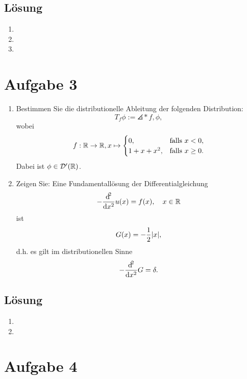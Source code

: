 \documentclass{exercise}
\begin{document}
    \subsection*{Lösung}
    \begin{enumerate}
        \item
        \item
        \item
    \end{enumerate}


    \section*{Aufgabe 3}
    
    \begin{problem}
        \begin{enumerate}
            \item Bestimmen Sie die distributionelle Ableitung der folgenden Distribution:
            \[
                T_f \phi := \angles*{f, \phi},
            \]
            wobei
            \[
                f: \mathbb{R} \to \mathbb{R}, x \mapsto \begin{cases}
                    0, & \text{falls }x < 0,\\
                    1 + x + x^2, & \text{falls }x \ge 0.
                \end{cases}
            \]
            Dabei ist \(\phi \in \mathcal{D}'\parentheses*{\R}\).
            \item Zeigen Sie: Eine Fundamentallösung der Differentialgleichung
            \[
                -\frac{\d^2}{\d x^2}u\parentheses*{x} = f\parentheses*{x}, \quad x \in \R
            \]
            ist
            \[
                G\parentheses*{x} = -\frac{1}{2}\absolute*{x},
            \]
            d.h. es gilt im distributionellen Sinne
            \[
                -\frac{\mathop{\mathrm{d}\!}^2}{\mathop{\mathrm{d}\!} x^2}G = \delta.
            \]
        \end{enumerate}
    \end{problem}
    
    \subsection*{Lösung}
    \begin{enumerate}
        \item
        \item
    \end{enumerate}


    \section*{Aufgabe 4}
    
\end{document}
